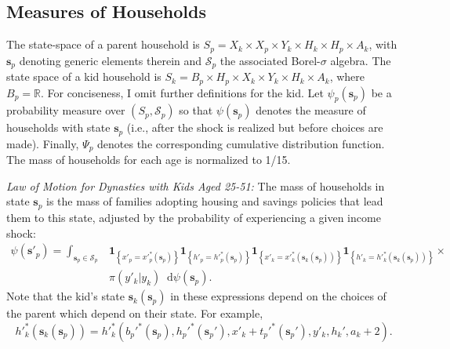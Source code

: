 \documentclass[12pt]{article}
\newcommand*\diff{\mathop{}\!\mathrm{d}}
\newcommand{\mc}{\mathcal}
\begin{document}
\subsection{Measures of Households}\label{sec:hhmeasures}
The state-space of a parent household is $S_p = X_k \times X_p \times Y_k \times H_k \times H_p \times A_k$, with $\mathbf{s}_p$ denoting generic elements therein and $\mc{S}_p$ the associated Borel-$\sigma$ algebra. The state space of a kid household is $S_k= B_p \times H_p \times X_k \times Y_k \times H_k \times A_k$, where $B_p=\mathbb{R}$. For conciseness, I omit further definitions for the kid. Let $\psi_p(\mathbf s_p)$ be a probability measure over $(S_p,\mc{S}_p)$ so that $\psi(\mathbf s_p)$ denotes the measure of households with state $\mathbf s_p$ (i.e., after the shock is realized but before choices are made). Finally, $\Psi_p$ denotes the corresponding cumulative distribution function. The mass of households for each age is normalized to 1/15.

\textit{Law of Motion for Dynasties with Kids Aged 25-51:} The mass of households in state $\mathbf{s}_p$ is the mass of families adopting housing and savings policies that lead them to this state, adjusted by the probability of experiencing a given income shock:
\begin{equation}\label{eq:LoM}
\begin{split}
\psi(\mathbf{s}'_p) = \int_{\mathbf{s}_p\in \mathcal{S}_p} & 
\mathbf{1}_{\left\{ x'_p = x'^*_p(\mathbf s_p) \right\} }
\mathbf{1}_{\left\{ h'_p = h'^*_p(\mathbf s_p) \right\} } 
\mathbf{1}_{\left\{ x'_k = x'^*_k(\mathbf s_k(\mathbf s_p))\right\}} 
\mathbf{1}_{\left\{ h'_k = h'^*_k(\mathbf s_k(\mathbf s_p))\right\}} \times \\
&\pi(y'_k|y_k)\diff \psi(\mathbf s_p).
\end{split}
\end{equation}
Note that the kid's state $\mathbf{s}_k(\mathbf{s}_p)$ in these expressions depend on the choices of the parent which depend on their state. For example, 
\begin{equation}
h'^*_k\left(\mathbf s_k(\mathbf s_p)\right) =h'^*_k\left(b_p'^*(\mathbf{s}_p),h_p'^*(\mathbf{s}_p'),x'_k + t_p'^*(\mathbf{s}_p'),y'_k,h_k',a_k+2 \right).
\end{equation}
\end{document}
